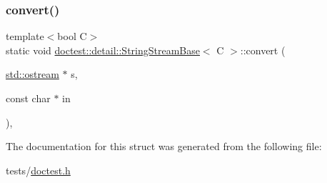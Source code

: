 \mbox{\label{structdoctest_1_1detail_1_1StringStreamBase_a7c248639907b26e46344b91d7ab90be7}} 
\subsubsection{\texorpdfstring{convert()}{convert()}\hspace{0.1cm}{\footnotesize\ttfamily [2/2]}}
{\footnotesize\ttfamily template$<$bool C$>$ \\
static void \hyperlink{structdoctest_1_1detail_1_1StringStreamBase}{doctest\+::detail\+::\+String\+Stream\+Base}$<$ C $>$\+::convert (\begin{DoxyParamCaption}\item[{\hyperlink{doctest_8h_a116af65cb5e924b33ad9d9ecd7a783f3}{std\+::ostream} $\ast$}]{s,  }\item[{const char $\ast$}]{in }\end{DoxyParamCaption})\hspace{0.3cm}{\ttfamily [inline]}, {\ttfamily [static]}}



The documentation for this struct was generated from the following file\+:\begin{DoxyCompactItemize}
\item 
tests/\hyperlink{doctest_8h}{doctest.\+h}\end{DoxyCompactItemize}
